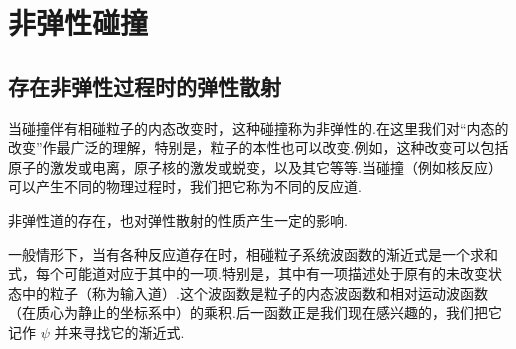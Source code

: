\chapter{非弹性碰撞}

\section{存在非弹性过程时的弹性散射}

当碰撞伴有相碰粒子的内态改变时，这种碰撞称为非弹性的.在这里我们对“内态的改变”作最广泛的理解，特别是，粒子的本性也可以改变.例如，这种改变可以包括原子的激发或电离，原子核的激发或蜕变，以及其它等等.当碰撞（例如核反应）可以产生不同的物理过程时，我们把它称为不同的反应道.

非弹性道的存在，也对弹性散射的性质产生一定的影响.

一般情形下，当有各种反应道存在时，相碰粒子系统波函数的渐近式是一个求和式，每个可能道对应于其中的一项.特别是，其中有一项描述处于原有的未改变状态中的粒子（称为输入道）.这个波函数是粒子的内态波函数和相对运动波函数（在质心为静止的坐标系中）的乘积.后一函数正是我们现在感兴趣的，我们把它记作 $\psi$ 并来寻找它的渐近式.

